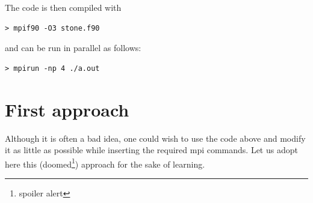 The code is then compiled with 
\begin{verbatim}
> mpif90 -O3 stone.f90
\end{verbatim}
and can be run in parallel as follows:
\begin{verbatim}
> mpirun -np 4 ./a.out 
\end{verbatim}

\section*{First approach}

Although it is often a bad idea, one could wish to use the code above and
modify it as little as possible while inserting the required mpi commands. Let us 
adopt here this (doomed\footnote{spoiler alert}) approach for the sake of learning.

